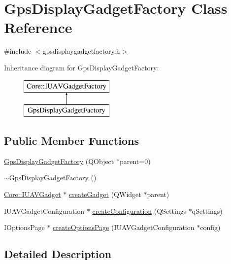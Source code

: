 \hypertarget{class_gps_display_gadget_factory}{\section{\-Gps\-Display\-Gadget\-Factory \-Class \-Reference}
\label{class_gps_display_gadget_factory}
}


{\ttfamily \#include $<$gpsdisplaygadgetfactory.\-h$>$}

\-Inheritance diagram for \-Gps\-Display\-Gadget\-Factory\-:\begin{figure}[H]
\begin{center}
\leavevmode
\includegraphics[height=2.000000cm]{class_gps_display_gadget_factory}
\end{center}
\end{figure}
\subsection*{\-Public \-Member \-Functions}
\begin{DoxyCompactItemize}
\item 
\hyperlink{group___g_p_s_gadget_plugin_ga5c7c8cda8cf65d39d9ae165194901eee}{\-Gps\-Display\-Gadget\-Factory} (\-Q\-Object $\ast$parent=0)
\item 
\hyperlink{group___g_p_s_gadget_plugin_ga82537537ded6a09ef83bb5b8480dc521}{$\sim$\-Gps\-Display\-Gadget\-Factory} ()
\item 
\hyperlink{class_core_1_1_i_u_a_v_gadget}{\-Core\-::\-I\-U\-A\-V\-Gadget} $\ast$ \hyperlink{group___g_p_s_gadget_plugin_gabda9dce6df1e2608e4450ae1573588df}{create\-Gadget} (\-Q\-Widget $\ast$parent)
\item 
\-I\-U\-A\-V\-Gadget\-Configuration $\ast$ \hyperlink{group___g_p_s_gadget_plugin_gae66522a3ebff0d0efac6e71ddf729657}{create\-Configuration} (\-Q\-Settings $\ast$q\-Settings)
\item 
\-I\-Options\-Page $\ast$ \hyperlink{group___g_p_s_gadget_plugin_gab72aeb74597d8373b64dce43943c9e75}{create\-Options\-Page} (\-I\-U\-A\-V\-Gadget\-Configuration $\ast$config)
\end{DoxyCompactItemize}


\subsection{\-Detailed \-Description}


